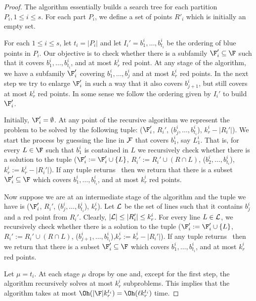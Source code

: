 \begin{proof}
The algorithm essentially builds a search tree for each partition $P_i, 1\leq i \leq s$. For each part $P_i$, we define a set of points $R'_i$ which is initially an empty set. 




For each $1 \leq i \leq s$, let $t_i=|P_i|$ and let $I_i'=b_1^i,\ldots,b_{t_i}^i$  be the ordering of blue points in $P_i$. Our objective is to check whether there is a subfamily $\F_i' \subseteq \F$ such that it covers $b_1^i,\ldots,b_{t_i}^i$, and at most $k_r^i$ red point. At any stage of the algorithm, we have a subfamily $\F_i'$ covering  
$b_1^i,\ldots, b_j^i$ and at most $k_r^i$ red points. In the next step we try to enlarge $\F_i'$  in such a way 
that it also covers $b_{j+1}^i$, but still covers at most $k_r^i$ red points. In some sense we follow the ordering given by $I_i'$ to build $\F_i'$. 

Initially, 
$\F_i'=\emptyset$. At any point of the recursive algorithm we represent the problem to be solved by the following tuple: 
($\F_i'$, $R_i'$, ($b_j^i,\ldots,b_{t_i}^i$), $k_r^i -|R_i'|$). 
We start the process by guessing the line in $\cal F$ that covers $b_1^i$, say $L_1^i$. That is, for every $L\in \F$ such that 
$b_1^i$ is contained in $L$ we recursively check whether there is a solution to the tuple 
 ($\F_i':=\F_i'\cup \{L\}$, $R_i':=R_i'\cup (R \cap L) $, ($b_2^i,\ldots,b_{t_i}^i$),$k_r^i:=k_r^i -|R_i'|$).  If any tuple returns \YES\ then we return that there is a subset $\F_i' \subseteq \F$ which covers $b_1^i,\ldots,b_{t_i}^i$, and at most $k_r^i$ red points. 

Now suppose we are at an intermediate stage of the algorithm and the tuple we have is ($\F_i'$, $R_i'$, ($b_j^i,\ldots,b_{t_i}^i$), $k_r^i$). Let $\cal L$ be the set of lines such that it contains $b_j^i$ and a red point from $R_i'$. Clearly, $|{\cal L}|\leq |R_i'| \leq k_r^i$. For every line $L\in  {\cal L}$, we  recursively check whether there is a solution to the tuple ($\F_i':=\F_i'\cup \{L\}$, $R_i':=R_i'\cup (R \cap L) $, ($b_{j+1}^i,\ldots,b_{t_i}^i$),$k_r^i:=k_r^i -|R_i'|$).  If any tuple returns \YES\ then we return that there is a subset $\F_i' \subseteq \F$ which covers $b_1^i,\ldots,b_{t_i}^i$, and at most $k_r^i$ red points. 

Let $\mu=t_i$.  At each stage $\mu$ drops by one and, except for the first step, the algorithm recursively solves at most $k_r^i$ subproblems. This implies that the algorithm takes at most $\Oh(|\F| k_r^{t_i})= \Oh(\ell k_r^{t_i})$ time.  





\end{proof}
